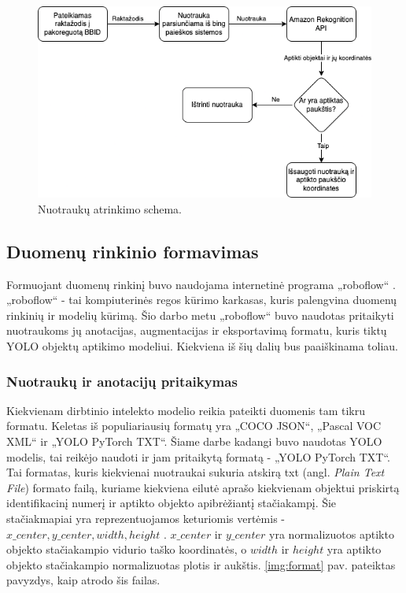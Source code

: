 \documentclass{VUMIFPSkursinis}
\begin{document}
\begin{figure}[H]
    \centering
    \includegraphics[scale=0.6]{img/bbid_diagrama.png}
    \caption{Nuotraukų atrinkimo schema.}
    \label{img:bbid}
\end{figure}

\subsection{Duomenų rinkinio formavimas}
Formuojant duomenų rinkinį buvo naudojama internetinė programa „roboflow“ \cite{roboflow}. „roboflow“ - tai kompiuterinės regos kūrimo karkasas, kuris palengvina duomenų rinkinių ir modelių kūrimą. Šio darbo metu „roboflow“ buvo naudotas pritaikyti nuotraukoms jų anotacijas, augmentacijas ir eksportavimą formatu, kuris tiktų YOLO objektų aptikimo modeliui. Kiekviena iš šių dalių bus paaiškinama toliau.

\subsubsection{Nuotraukų ir anotacijų pritaikymas}
Kiekvienam dirbtinio intelekto modelio reikia pateikti duomenis tam tikru formatu. Keletas iš populiariausių formatų yra „COCO JSON“, „Pascal VOC XML“ ir „YOLO PyTorch TXT“. Šiame darbe kadangi buvo naudotas YOLO modelis, tai reikėjo naudoti ir jam pritaikytą formatą - „YOLO PyTorch TXT“. Tai formatas, kuris kiekvienai nuotraukai sukuria atskirą txt (angl. \emph{Plain Text File}) formato failą, kuriame kiekviena eilutė aprašo kiekvienam objektui priskirtą identifikacinį numerį ir aptikto objekto apibrėžiantį stačiakampį. Šie stačiakmapiai yra reprezentuojamos keturiomis vertėmis - $ x\_center, y\_center, width, height$ \cite{Jocher_YOLOv5_by_Ultralytics_2020}. $x\_center$ ir $y\_center$ yra normalizuotos aptikto objekto stačiakampio vidurio taško koordinatės, o $width$  ir $height$ yra aptikto objekto stačiakampio normalizuotas plotis ir aukštis. \ref{img:format} pav. pateiktas pavyzdys, kaip atrodo šis failas.
\end{document}
